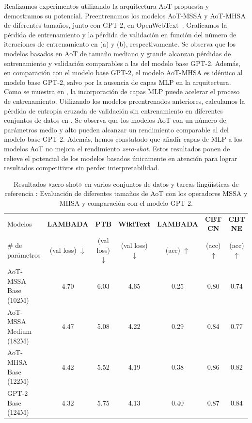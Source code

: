 \documentclass[../../book-main_es.tex]{subfiles}
\begin{document}
Realizamos experimentos utilizando la arquitectura AoT propuesta y
demostramos su potencial. Preentrenamos los modelos AoT-MSSA y AoT-MHSA
de diferentes tamaños, junto con GPT-2, en
OpenWebText~\citep{Gokaslan2019OpenWeb}. Graficamos la pérdida de entrenamiento
y la pérdida de validación en función del número de iteraciones de entrenamiento en
(a) y (b), respectivamente. Se observa que los modelos basados en AoT de tamaño mediano
y grande alcanzan pérdidas de entrenamiento y validación
comparables a las del modelo base GPT-2. Además,
en comparación con el modelo base GPT-2, el modelo AoT-MHSA es idéntico
al modelo base GPT-2, salvo por la ausencia de capas MLP en la
arquitectura. Como se muestra en , la incorporación de capas MLP
puede acelerar el proceso de entrenamiento. Utilizando los modelos preentrenados
anteriores, calculamos la pérdida de entropía cruzada de validación sin entrenamiento
en diferentes conjuntos de datos en . Se observa que los
modelos AoT con un número de parámetros medio y alto pueden alcanzar
un rendimiento comparable al del modelo base GPT-2. Además, hemos constatado
que añadir capas de MLP a los modelos AoT no mejora el rendimiento
\textit{zero-shot}. Estos resultados ponen de relieve el potencial de los modelos basados únicamente en atención
para lograr resultados competitivos sin perder interpretabilidad.

\begin{table}[!htbp]
\caption{Resultados «zero-shot» en varios conjuntos de datos y tareas lingüísticas de referencia :
Evaluación de diferentes tamaños de AoT con los operadores MSSA y MHSA
y comparación con el modelo GPT-2.}\vskip 0.1in
\centering
\resizebox{1\columnwidth}{!}
{
\begin{tabular}{l|cccccc}
    \toprule
    Modelos  & {\bf LAMBADA} & {\bf PTB} & {\bf WikiText} & {\bf
    LAMBADA} & {\bf CBT CN} & {\bf CBT NE} \\
    \# de parámetros  & (val loss) $\downarrow$ &  (val loss)
    $\downarrow$ &(val loss) $\downarrow$ & (acc) $\uparrow$ &(acc)
    $\uparrow$ &(acc) $\uparrow$ \\
    \midrule
    AoT-MSSA Base (102M) & 4.70 & 6.03 & 4.65 & 0.25 & 0.80 & 0.74\\
    AoT-MSSA Medium (182M) & 4.47 & 5.08 & 4.22 & 0.29 & 0.84 & 0.77 \\
    AoT-MHSA Base (122M) & 4.42 & 5.52 & 4.19 & 0.38 & 0.86 & 0.82\\
    GPT-2 Base (124M) & 4.32 & 5.75 & 4.13 &  0.40 &  0.87 &  0.84 \\
    \bottomrule
\end{tabular}
}
\label{tab:zeroshot}
\end{table}
\vspace{-0.05in}
\end{document}
